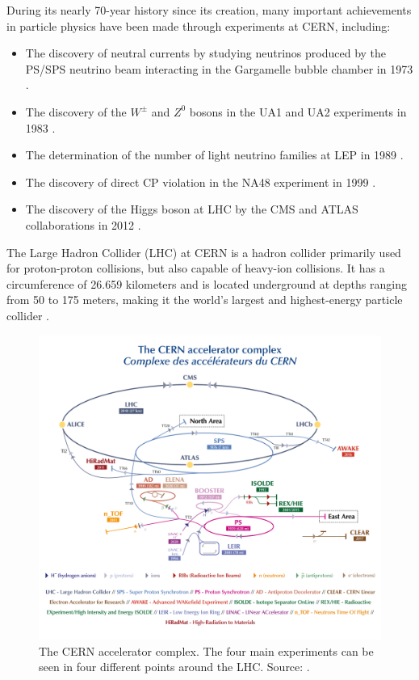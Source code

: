 During its nearly 70-year history since its creation, many important achievements in particle physics have been made through experiments at CERN, including:
\begin{itemize}
    \setlength\itemsep{0em}
    \item The discovery of neutral currents by studying neutrinos produced by the PS/SPS neutrino beam interacting in the Gargamelle bubble chamber in 1973 \cite{GargamelleNeutrino:1973jyy}.
    \item The discovery of the $W^\pm$ and $Z^0$ bosons in the UA1 and UA2 experiments in 1983 \cite{UA1:1983crd, UA2:1983tsx}.
    \item The determination of the number of light neutrino families at LEP in 1989 \cite{ALEPH:1989kcj}.
    \item The discovery of direct CP violation in the NA48 experiment in 1999 \cite{NA48:1999szy}.
    \item The discovery of the Higgs boson at LHC by the CMS and ATLAS collaborations in 2012 \cite{CMS:2012qbp,ATLAS:2012yve}.
\end{itemize}

The Large Hadron Collider (LHC) at CERN is a hadron collider primarily used for proton-proton collisions, but also capable of heavy-ion collisions. It has a circumference of 26.659 kilometers and is located underground at depths ranging from 50 to 175 meters, making it the world's largest and highest-energy particle collider \cite{Evans:2008zzb, CERN:Facts_figures}.

\begin{figure}[!ht]
    \vspace*{-0.0cm}
    \centering
    \setlength{\mylength}{\textwidth}
    \includegraphics[width=0.84\mylength]{resources/LHC.png}
    \vspace*{-0.0cm}
    \caption{The CERN accelerator complex. The four main experiments can be seen in four different points around the LHC. Source: \cite{Mobs:2684277}.}
    \label{fig:CERN_LHC}
    \vspace*{-0.3cm}
\end{figure}


